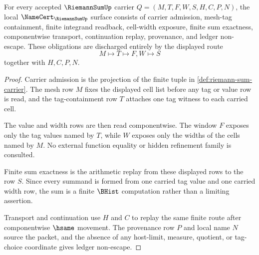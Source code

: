 \begin{theorem}
\label{thm:riemann-sum-namecert-obligations}
For every accepted $\RiemannSumUp$ carrier $Q=(M,T,F,W,S,H,C,P,N)$, the local $\NameCert_{\RiemannSumUp}$ surface consists of carrier admission, mesh-tag containment, finite integrand readback, cell-width exposure, finite sum exactness, componentwise transport, continuation replay, provenance, and ledger non-escape. These obligations are discharged entirely by the displayed route
$$
M\longmapsto T\longmapsto F,W\longmapsto S
$$
together with $H,C,P,N$.
\end{theorem}
\begin{proof}
Carrier admission is the projection of the finite tuple in \autoref{def:riemann-sum-carrier}. The mesh row $M$ fixes the displayed cell list before any tag or value row is read, and the tag-containment row $T$ attaches one tag witness to each carried cell.

The value and width rows are then read componentwise. The window $F$ exposes only the tag values named by $T$, while $W$ exposes only the widths of the cells named by $M$. No external function equality or hidden refinement family is consulted.

Finite sum exactness is the arithmetic replay from these displayed rows to the row $S$. Since every summand is formed from one carried tag value and one carried width row, the sum is a finite $\BHist$ computation rather than a limiting assertion.

Transport and continuation use $H$ and $C$ to replay the same finite route after componentwise $\hsame$ movement. The provenance row $P$ and local name $N$ source the packet, and the absence of any host-limit, measure, quotient, or tag-choice coordinate gives ledger non-escape.
\end{proof}

